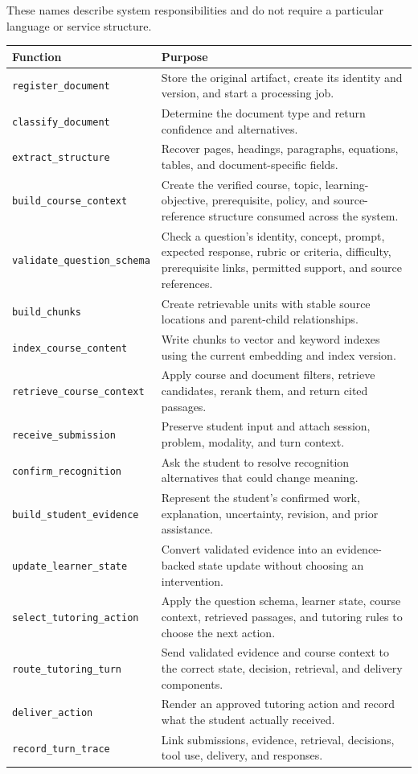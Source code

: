 \documentclass[11pt]{article}
\begin{document}
These names describe system responsibilities and do not require a particular language or service structure.

\noindent\begin{tabularx}{\textwidth}{@{}p{}X@{}}
\toprule
\textbf{Function} & \textbf{Purpose} \\
\midrule
\texttt{register\_document} & Store the original artifact, create its identity and version, and start a processing job. \\
\texttt{classify\_document} & Determine the document type and return confidence and alternatives. \\
\texttt{extract\_structure} & Recover pages, headings, paragraphs, equations, tables, and document-specific fields. \\
\texttt{build\_course\_}\allowbreak\texttt{context} & Create the verified course, topic, learning-objective, prerequisite, policy, and source-reference structure consumed across the system. \\
\texttt{validate\_question\_}\allowbreak\texttt{schema} & Check a question's identity, concept, prompt, expected response, rubric or criteria, difficulty, prerequisite links, permitted support, and source references. \\
\texttt{build\_chunks} & Create retrievable units with stable source locations and parent-child relationships. \\
\texttt{index\_course\_}\allowbreak\texttt{content} & Write chunks to vector and keyword indexes using the current embedding and index version. \\
\texttt{retrieve\_course\_}\allowbreak\texttt{context} & Apply course and document filters, retrieve candidates, rerank them, and return cited passages. \\
\texttt{receive\_submission} & Preserve student input and attach session, problem, modality, and turn context. \\
\texttt{confirm\_recognition} & Ask the student to resolve recognition alternatives that could change meaning. \\
\texttt{build\_student\_}\allowbreak\texttt{evidence} & Represent the student's confirmed work, explanation, uncertainty, revision, and prior assistance. \\
\texttt{update\_learner\_}\allowbreak\texttt{state} & Convert validated evidence into an evidence-backed state update without choosing an intervention. \\
\texttt{select\_tutoring\_}\allowbreak\texttt{action} & Apply the question schema, learner state, course context, retrieved passages, and tutoring rules to choose the next action. \\
\texttt{route\_tutoring\_turn} & Send validated evidence and course context to the correct state, decision, retrieval, and delivery components. \\
\texttt{deliver\_action} & Render an approved tutoring action and record what the student actually received. \\
\texttt{record\_turn\_trace} & Link submissions, evidence, retrieval, decisions, tool use, delivery, and responses. \\
\bottomrule
\end{tabularx}
\newpage
\end{document}
